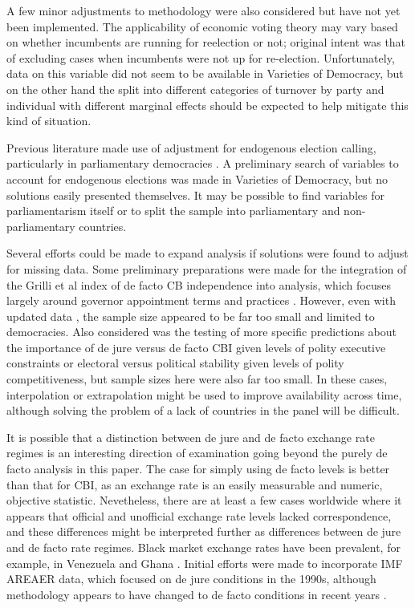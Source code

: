 \documentclass{article}
\begin{document}
    A few minor adjustments to methodology were also considered but have not yet been implemented. The applicability of economic voting theory may vary based on whether incumbents are running for reelection or not; original intent was that of excluding cases when incumbents were not up for re-election. Unfortunately, data on this variable did not seem to be available in Varieties of Democracy, but on the other hand the split into different categories of turnover by party and individual with different marginal effects should be expected to help mitigate this kind of situation.

    Previous literature made use of adjustment for endogenous election calling, particularly in parliamentary democracies \citep{bernhard_political_2002-1,clark_monetary_2013}. A preliminary search of variables to account for endogenous elections was made in Varieties of Democracy, but no solutions easily presented themselves. It may be possible to find variables for parliamentarism itself or to split the sample into parliamentary and non-parliamentary countries.

    Several efforts could be made to expand analysis if solutions were found to adjust for missing data. Some preliminary preparations were made for the integration of the Grilli et al index of de facto CB independence into analysis, which focuses largely around governor appointment terms and practices \citep{grilli_political_1991}. However, even with updated data \citep{romelli_regulatory_2015}, the sample size appeared to be far too small and limited to democracies. Also considered was the testing of more specific predictions about the importance of de jure versus de facto CBI given levels of polity executive constraints or electoral versus political stability given levels of polity competitiveness, but sample sizes here were also far too small. In these cases, interpolation or extrapolation might be used to improve availability across time, although solving the problem of a lack of countries in the panel will be difficult.

    It is possible that a distinction between de jure and de facto exchange rate regimes is an interesting direction of examination going beyond the purely de facto analysis in this paper. The case for simply using de facto levels is better than that for CBI, as an exchange rate is an easily measurable and numeric, objective statistic. Nevetheless, there are at least a few cases worldwide where it appears that official and unofficial exchange rate levels lacked correspondence, and these differences might be interpreted further as differences between de jure and de facto rate regimes. Black market exchange rates have been prevalent, for example, in Venezuela and Ghana \citep{kiguel_parallel_1995}. Initial efforts were made to incorporate IMF AREAER data, which focused on de jure conditions in the 1990s, although methodology appears to have changed to de facto conditions in recent years \citep{imf_imf_2020}.
\end{document}
